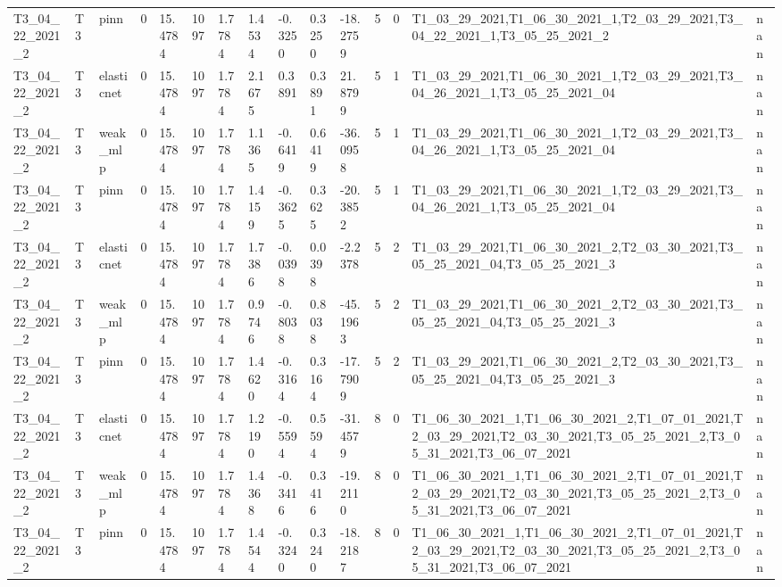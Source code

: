 \begin{table}[t]
\begin{tabular}{lllllllllllllll}
T3\_04\_22\_2021\_2 & T3 & pinn & 0 & 15.4784 & 1097 & 1.7784 & 1.4534 & -0.3250 & 0.3250 & -18.2759 & 5 & 0 & T1\_03\_29\_2021,T1\_06\_30\_2021\_1,T2\_03\_29\_2021,T3\_04\_22\_2021\_1,T3\_05\_25\_2021\_2 & nan \\
T3\_04\_22\_2021\_2 & T3 & elasticnet & 0 & 15.4784 & 1097 & 1.7784 & 2.1675 & 0.3891 & 0.3891 & 21.8799 & 5 & 1 & T1\_03\_29\_2021,T1\_06\_30\_2021\_1,T2\_03\_29\_2021,T3\_04\_26\_2021\_1,T3\_05\_25\_2021\_04 & nan \\
T3\_04\_22\_2021\_2 & T3 & weak\_mlp & 0 & 15.4784 & 1097 & 1.7784 & 1.1365 & -0.6419 & 0.6419 & -36.0958 & 5 & 1 & T1\_03\_29\_2021,T1\_06\_30\_2021\_1,T2\_03\_29\_2021,T3\_04\_26\_2021\_1,T3\_05\_25\_2021\_04 & nan \\
T3\_04\_22\_2021\_2 & T3 & pinn & 0 & 15.4784 & 1097 & 1.7784 & 1.4159 & -0.3625 & 0.3625 & -20.3852 & 5 & 1 & T1\_03\_29\_2021,T1\_06\_30\_2021\_1,T2\_03\_29\_2021,T3\_04\_26\_2021\_1,T3\_05\_25\_2021\_04 & nan \\
T3\_04\_22\_2021\_2 & T3 & elasticnet & 0 & 15.4784 & 1097 & 1.7784 & 1.7386 & -0.0398 & 0.0398 & -2.2378 & 5 & 2 & T1\_03\_29\_2021,T1\_06\_30\_2021\_2,T2\_03\_30\_2021,T3\_05\_25\_2021\_04,T3\_05\_25\_2021\_3 & nan \\
T3\_04\_22\_2021\_2 & T3 & weak\_mlp & 0 & 15.4784 & 1097 & 1.7784 & 0.9746 & -0.8038 & 0.8038 & -45.1963 & 5 & 2 & T1\_03\_29\_2021,T1\_06\_30\_2021\_2,T2\_03\_30\_2021,T3\_05\_25\_2021\_04,T3\_05\_25\_2021\_3 & nan \\
T3\_04\_22\_2021\_2 & T3 & pinn & 0 & 15.4784 & 1097 & 1.7784 & 1.4620 & -0.3164 & 0.3164 & -17.7909 & 5 & 2 & T1\_03\_29\_2021,T1\_06\_30\_2021\_2,T2\_03\_30\_2021,T3\_05\_25\_2021\_04,T3\_05\_25\_2021\_3 & nan \\
T3\_04\_22\_2021\_2 & T3 & elasticnet & 0 & 15.4784 & 1097 & 1.7784 & 1.2190 & -0.5594 & 0.5594 & -31.4579 & 8 & 0 & T1\_06\_30\_2021\_1,T1\_06\_30\_2021\_2,T1\_07\_01\_2021,T2\_03\_29\_2021,T2\_03\_30\_2021,T3\_05\_25\_2021\_2,T3\_05\_31\_2021,T3\_06\_07\_2021 & nan \\
T3\_04\_22\_2021\_2 & T3 & weak\_mlp & 0 & 15.4784 & 1097 & 1.7784 & 1.4368 & -0.3416 & 0.3416 & -19.2110 & 8 & 0 & T1\_06\_30\_2021\_1,T1\_06\_30\_2021\_2,T1\_07\_01\_2021,T2\_03\_29\_2021,T2\_03\_30\_2021,T3\_05\_25\_2021\_2,T3\_05\_31\_2021,T3\_06\_07\_2021 & nan \\
T3\_04\_22\_2021\_2 & T3 & pinn & 0 & 15.4784 & 1097 & 1.7784 & 1.4544 & -0.3240 & 0.3240 & -18.2187 & 8 & 0 & T1\_06\_30\_2021\_1,T1\_06\_30\_2021\_2,T1\_07\_01\_2021,T2\_03\_29\_2021,T2\_03\_30\_2021,T3\_05\_25\_2021\_2,T3\_05\_31\_2021,T3\_06\_07\_2021 & nan \\

\end{tabular}
\end{table}
